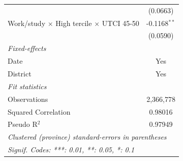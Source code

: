 \begin{table}[htbp]
\begin{tabular}{lc}
                                                                        & (0.0663)\\   
      Work/study $\times$ High tercile $\times$ UTCI 45-50              & -0.1168$^{**}$\\   
                                                                        & (0.0590)\\   
      \midrule
      \emph{Fixed-effects}\\
      Date                                                              & Yes\\  
      District                                                          & Yes\\  
      \midrule
      \emph{Fit statistics}\\
      Observations                                                      & 2,366,778\\  
      Squared Correlation                                               & 0.98016\\  
      Pseudo R$^2$                                                      & 0.97949\\  
      \midrule \midrule
      \multicolumn{2}{l}{\emph{Clustered (province) standard-errors in parentheses}}\\
      \multicolumn{2}{l}{\emph{Signif. Codes: ***: 0.01, **: 0.05, *: 0.1}}\\
   \end{tabular}
\end{table}


